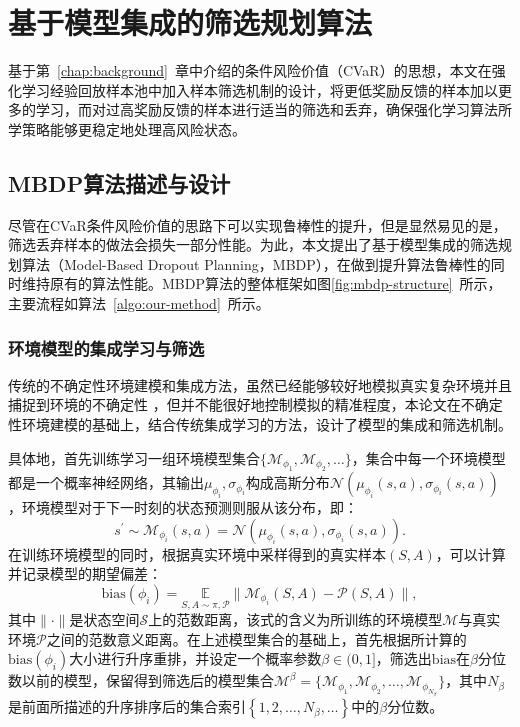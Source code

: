
\chapter{基于模型集成的筛选规划算法}\label{chap:mbdp}

基于第~\ref{chap:background}~章中介绍的条件风险价值（CVaR）的思想，本文在强化学习经验回放样本池中加入样本筛选机制的设计，将更低奖励反馈的样本加以更多的学习，而对过高奖励反馈的样本进行适当的筛选和丢弃，确保强化学习算法所学策略能够更稳定地处理高风险状态。

\section{MBDP算法描述与设计}

尽管在CVaR条件风险价值的思路下可以实现鲁棒性的提升，但是显然易见的是，筛选丢弃样本的做法会损失一部分性能。为此，本文提出了基于模型集成的筛选规划算法（Model-Based Dropout Planning，MBDP），在做到提升算法鲁棒性的同时维持原有的算法性能。MBDP算法的整体框架如图\ref{fig:mbdp-structure}~所示，主要流程如算法~\ref{algo:our-method}~所示。

\subsection{环境模型的集成学习与筛选}\label{sec:model-method}

传统的不确定性环境建模和集成方法，虽然已经能够较好地模拟真实复杂环境并且捕捉到环境的不确定性 \cite{duan2007multi,zhang2021mbdp}，但并不能很好地控制模拟的精准程度，本论文在不确定性环境建模的基础上，结合传统集成学习的方法，设计了模型的集成和筛选机制。

具体地，首先训练学习一组环境模型集合$\{\mathcal{M}_{\phi_1},\mathcal{M}_{\phi_2},\ldots\}$，集合中每一个环境模型都是一个概率神经网络，其输出$\mu_{\phi_i},\sigma_{\phi_i}$构成高斯分布$\mathcal{N}(\mu_{\phi_i}(s,a),\sigma_{\phi_i}(s,a))$，环境模型对于下一时刻的状态预测则服从该分布，即：
\begin{equation}
    s^\prime \sim \mathcal{M}_{\phi_i}(s,a) = \mathcal{N}(\mu_{\phi_i}(s,a),\sigma_{\phi_i}(s,a)).
\end{equation}
在训练环境模型的同时，根据真实环境中采样得到的真实样本$(S,A)$，可以计算并记录模型的期望偏差：
\begin{equation}
    \mathrm{bias}(\phi_i) = \underset{S,A\sim \pi,\mathcal{P}}{\mathbb{E}}\|\mathcal{M}_{\phi_i}(S,A)-\mathcal{P}(S,A)\|,
\end{equation}
其中$\|\cdot\|$是状态空间$\mathcal{S}$上的范数距离，该式的含义为所训练的环境模型$\mathcal{M}$与真实环境$\mathcal{P}$之间的范数意义距离。在上述模型集合的基础上，首先根据所计算的$\mathrm{bias}(\phi_i)$大小进行升序重排，并设定一个概率参数$\beta\in(0,1]$，筛选出$\mathrm{bias}$在$\beta$分位数以前的模型，保留得到筛选后的模型集合$\mathcal{M}^\beta = \{\mathcal{M}_{\phi_1},\mathcal{M}_{\phi_2},\ldots,\mathcal{M}_{\phi_{N_\beta}}\}$，其中$N_\beta$是前面所描述的升序排序后的集合索引$\left\{1,2,\ldots,N_\beta,\ldots\right\}$中的$\beta$分位数。

